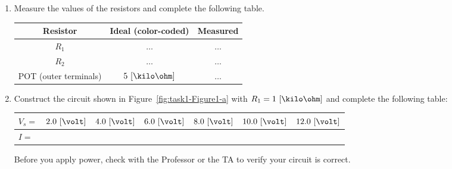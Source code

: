 \begin{enumerate}
\item Measure the values of the resistors and complete the following table.

  \begin{center}
  \begin{tabular}{c|c|c}
    \toprule
    Resistor &  Ideal (color-coded) & Measured\\
    \toprule                                        %
    $R_1$ & $\ldots$ & $\ldots$\\                   %
    $R_2$ & $\ldots$ & $\ldots$\\                   %
    POT (outer terminals) & $5~[\kilo\ohm]$ & $\ldots$\\   %
    \bottomrule
  \end{tabular}    
  \end{center}


  
\item Construct the circuit shown in Figure~\ref{fig:task1-Figure1-a} with $R_1=1~[\kilo\ohm]$ and complete the following table:
  \begin{center}
  \begin{tabular}{|l|l|l|l|l|l|l|}
    \toprule
    $V_s=$ &  $2.0~[\volt]$ & $4.0~[\volt]$ & $6.0~[\volt]$ & $8.0~[\volt]$ &$10.0~[\volt]$ & $12.0~[\volt]$ \\                            %
    \hline                     %
    $I = $   & & & & & &\\     %
    \bottomrule                %
  \end{tabular}      
  \end{center}

  \begin{mdframed}[roundcorner=5pt,backgroundcolor=yellow!50]
    Before you apply power, check with the Professor or the TA to verify your circuit is correct. 
  \end{mdframed}
  

\end{enumerate}
